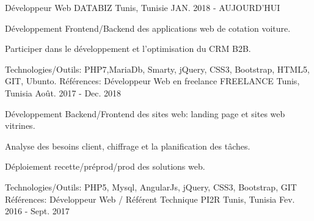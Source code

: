 \begin{cventries}
  \techentries
    {Développeur Web}
    {DATABIZ}
    {Tunis, Tunisie}
    {JAN. 2018 - AUJOURD'HUI}
    {
      \begin{cvitems}
		    \item {Développement Frontend/Backend des applications web de cotation voiture.}		
		    \item {Participer dans le développement et l'optimisation du CRM B2B.}
      \end{cvitems}
    }
    {\textcolor{awesome}{Technologies/Outils: } {\color{graytext}}  {PHP7,MariaDb, Smarty, jQuery, CSS3, Bootstrap, HTML5, GIT, Ubunto.}}
    {Références:} 
    {\href{https://www.reprise-citroen.fr//}{} \break
     \href{https://www.reprise-cash-bypeugeot.fr/}{} \break
     \href{https://www.reprise.dsautomobiles.fr/}{}\break
     \href{https://ankaufservice.renault.de/}{}\break
    }
  \techentries
    {Développeur Web en freelance}
    {FREELANCE}
    {Tunis, Tunisia}
    {Août. 2017 - Dec. 2018}
    {
      \begin{cvitems}
        \item {Développement Backend/Frontend des sites web: landing page et sites web vitrines.}
        \item {Analyse des besoins client, chiffrage et la planification des tâches.}
        \item {Déploiement recette/préprod/prod des solutions web.}
      \end{cvitems}
    }
    {\textcolor{awesome}{Technologies/Outils: } {\color{graytext}}  {PHP5, Mysql, AngularJs, jQuery, CSS3, Bootstrap, GIT}}
    {Références:} 
    {\href{http://www.cooperons.com/}{} \break
    \href{http://www.tisc.tn/ }{} \break
    }
  \techentries
    {Développeur Web / Référent Technique}
    {PI2R}
    {Tunis, Tunisia}
    {Fev. 2016 - Sept. 2017}

\end{cventries}
